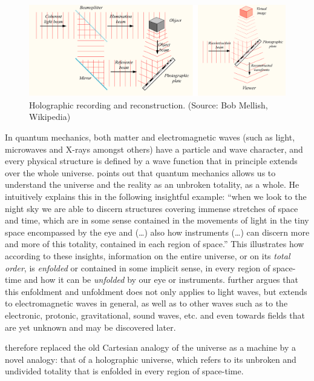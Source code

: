 \documentclass[
  11pt,
]{book}
\begin{document}
\begin{figure}

{\centering \includegraphics[width=1\linewidth]{./figs/holographySmall} 

}

\caption{Holographic recording and reconstruction. (Source: Bob Mellish, Wikipedia)}\label{fig:hologram1}
\end{figure}

In quantum mechanics, both matter and electromagnetic waves (such as light, microwaves and X-rays amongst others) have a particle and wave character, and every physical structure is defined by a wave function that in principle extends over the whole universe. \citet{bohm1980} points out that quantum mechanics allows us to understand the universe and the reality as an unbroken totality, as a whole. He intuitively explains this in the following insightful example: ``when we look to the night sky we are able to discern structures covering immense stretches of space and time, which are in some sense contained in the movements of light in the tiny space encompassed by the eye and (\ldots) also how instruments (\ldots) can discern more and more of this totality, contained in each region of space.'' This illustrates how according to these insights, information on the entire universe, or on its \emph{total order}, is \emph{enfolded} or contained in some implicit sense, in every region of space-time and how it can be \emph{unfolded} by our eye or instruments. \citet{bohm1980} further argues that this enfoldment and unfoldment does not only applies to light waves, but extends to electromagnetic waves in general, as well as to other waves such as to the electronic, protonic, gravitational, sound waves, etc. and even towards fields that are yet unknown and may be discovered later.

\citet{bohm1980} therefore replaced the old Cartesian analogy of the universe as a machine by a novel analogy: that of a holographic universe, which refers to its unbroken and undivided totality that is enfolded in every region of space-time.
\end{document}
